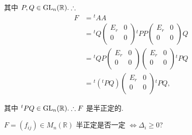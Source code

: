 \documentclass[color=black,device=normal,lang=cn,mode=geye]{elegantnote}
\begin{document}
\begin{solution}
    其中 $P,Q\in\operatorname{GL} _n(\mathbb{R}).\therefore$
    \begin{align*}
        F & ={}^tAA \\
        & ={}^tQ\begin{pmatrix}
            E_r & 0 \\
            0 & 0 \\
        \end{pmatrix}{}^tPP\begin{pmatrix}
            E_r & 0 \\
            0 & 0 \\
        \end{pmatrix}Q \\
        & ={}^tQP\begin{pmatrix}
            E_r & 0 \\
            0 & 0 \\
        \end{pmatrix}\begin{pmatrix}
            E_r & 0 \\
            0 & 0 \\
        \end{pmatrix}{}^tPQ \\
        & ={}^t({}^tPQ)\begin{pmatrix}
            E_r & 0 \\
            0 & 0 \\
        \end{pmatrix}{}^tPQ,
    \end{align*}

    其中 ${}^tPQ\in\operatorname{GL} _n(\mathbb{R}).\therefore F$ 是半正定的.
\end{solution}
\begin{exercisec}%
    $F=(f_{ij})\in M_n(\mathbb{R})$ 半正定是否一定 $\Leftrightarrow\Delta_i\geq0$?
\end{exercisec}
\end{document}
